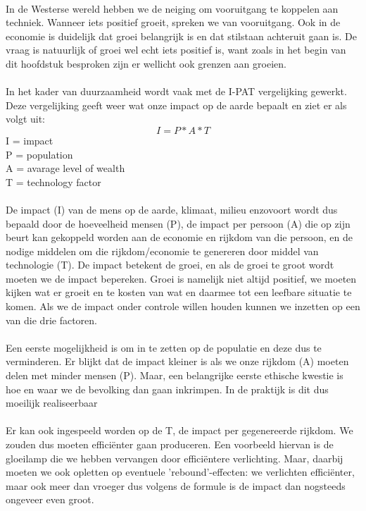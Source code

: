 \documentclass[../summary.tex]{subfiles}
\begin{document}
	\\
	In de Westerse wereld hebben we de neiging om vooruitgang te koppelen aan techniek. Wanneer iets positief groeit, spreken we van vooruitgang. Ook in de economie is duidelijk dat groei belangrijk is en dat stilstaan achteruit gaan is. De vraag is natuurlijk of groei wel echt iets positief is, want zoals in het begin van dit hoofdstuk besproken zijn er wellicht ook grenzen aan groeien.\\
	\\
	In het kader van duurzaamheid wordt vaak met de I-PAT vergelijking gewerkt. Deze vergelijking geeft weer wat onze impact op de aarde bepaalt en ziet er als volgt uit:\\
	\begin{equation} \label{eqn}
		I = P * A * T
	\end{equation}
	I = impact\\
	P = population\\
	A = avarage level of wealth\\
	T = technology factor\\
	\\
	De impact (I) van de mens op de aarde, klimaat, milieu enzovoort wordt dus bepaald door de hoeveelheid mensen (P), de impact per persoon (A) die op zijn beurt kan gekoppeld worden aan de economie en rijkdom van die persoon, en de nodige middelen om die rijkdom/economie te genereren door middel van technologie (T). De impact betekent de groei, en als de groei te groot wordt moeten we de impact bepereken. Groei is namelijk niet altijd positief, we moeten kijken wat er groeit en te kosten van wat en daarmee tot een leefbare situatie te komen. Als we de impact onder controle willen houden kunnen we inzetten op een van die drie factoren.\\
	\\
	Een eerste mogelijkheid is om in te zetten op de populatie en deze dus te verminderen. Er blijkt dat de impact kleiner is als we onze rijkdom (A) moeten delen met minder mensen (P). Maar, een belangrijke eerste ethische kwestie is hoe en waar we de bevolking dan gaan inkrimpen. In de praktijk is dit dus moeilijk realiseerbaar\\
	\\
	 Er kan ook ingespeeld worden op de T, de impact per gegenereerde rijkdom. We zouden dus moeten efficiënter gaan produceren. Een voorbeeld hiervan is de gloeilamp die we hebben vervangen door efficiëntere verlichting. Maar, daarbij moeten we ook opletten op eventuele 'rebound'-effecten: we verlichten efficiënter, maar ook meer dan vroeger dus volgens de formule is de impact dan nogsteeds ongeveer even groot.\\
\end{document}
